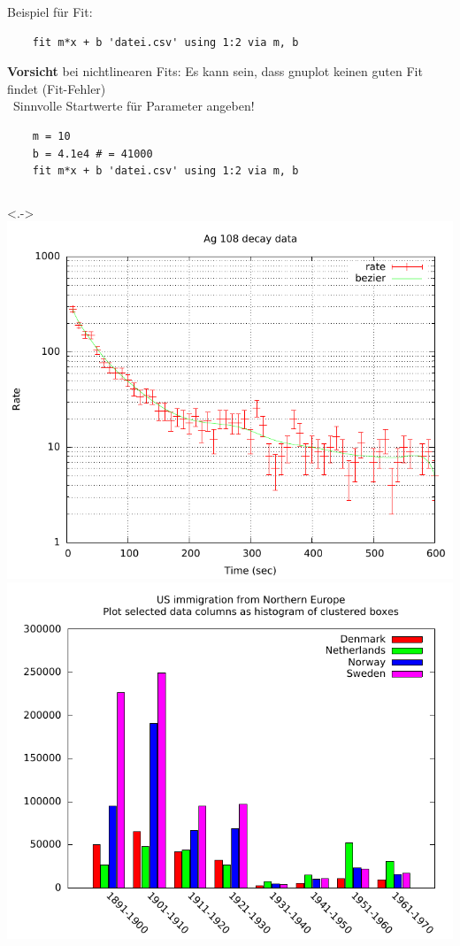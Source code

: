 \begin{frame}[<+->][fragile]

	Beispiel für Fit:
	\begin{lstlisting}
	fit m*x + b 'datei.csv' using 1:2 via m, b
	\end{lstlisting}
	
	\textbf{Vorsicht} bei nichtlinearen Fits: Es kann sein, dass gnuplot keinen guten Fit findet (Fit-Fehler)\\
	\textrightarrow~Sinnvolle Startwerte für Parameter angeben!
	\begin{lstlisting}
	m = 10
	b = 4.1e4 # = 41000
	fit m*x + b 'datei.csv' using 1:2 via m, b
	\end{lstlisting}

	\centering
	\begin{columns}<.->
		\includegraphics[width=\textwidth]{res/gnuplot_silver.pdf}
		\hspace*{-0.02\textwidth}
		\includegraphics[width=\textwidth]{res/gnuplot_histogram.pdf}

\end{columns}
\end{frame}

